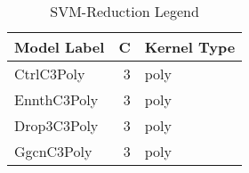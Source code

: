 \begin{table}
\centering
\caption{SVM-Reduction Legend}
\label{tab:SVM-Reduction_legend}
\begin{tabular}{lrl}
\toprule
Model Label & C & Kernel Type \\
\midrule
CtrlC3Poly & 3 & poly \\
EnnthC3Poly & 3 & poly \\
Drop3C3Poly & 3 & poly \\
GgcnC3Poly & 3 & poly \\
\bottomrule
\end{tabular}
\end{table}
